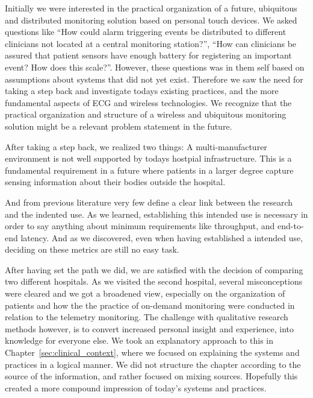 Initially we were interested in the practical organization of a future, ubiquitous and distributed monitoring solution based on personal touch devices. We asked questions like ``How could alarm triggering events be distributed to different clinicians not located at a central monitoring station?'', ``How can clinicians be assured that patient sensors have enough battery for registering an important event? How does this scale?''. However, these questions was in them self based on assumptions about systems that did not yet exist. Therefore we saw the need for taking a step back and investigate todays existing practices, and the more fundamental aspects of ECG and wireless technologies. We recognize that the practical organization and structure of a wireless and ubiquitous monitoring solution might be a relevant problem statement in the future.

After taking a step back, we realized two things: A multi-manufacturer environment is not well supported by todays hostpial infrastructure. This is a fundamental requirement in a future where patients in a larger degree capture sensing information about their bodies outside the hospital. 

And from previous literature very few define a clear link between the research and the indented use. As we learned, establishing this intended use is necessary in order to say anything about minimum requirements like throughput, and end-to-end latency. And as we discovered, even when having established a intended use, deciding on these metrics are still no easy task.

After having set the path we did, we are satisfied with the decision of comparing two different hospitals. As we visited the second hospital, several misconceptions were cleared and we got a broadened view, especially on the organization of patients and how the the practice of on-demand monitoring were conducted in relation to the telemetry monitoring. The challenge with qualitative research methods however, is to convert increased personal insight and experience, into knowledge for everyone else. We took an explanatory approach to this in Chapter~\ref{sec:clinical_context}, where we focused on explaining the systems and practices in a logical manner. We did not structure the chapter according to the source of the information, and rather focused on mixing sources. Hopefully this created a more compound impression of today's systems and practices.

